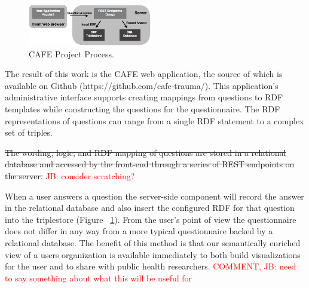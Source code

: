 \documentclass{amia}
\begin{document}
\begin{figure}
  \begin{center}
    \includegraphics[width=0.48\textwidth]{pics/cafe_process2.png}
  \end{center}
  \caption{CAFE Project Process.}
  \label{cafe_process}
\end{figure}

The result of this work is the CAFE web application, the source of which is available on Github (https://github.com/cafe-trauma/). 
This application's administrative interface supports creating mappings from questions to RDF templates while constructing the questions for the questionnaire. The RDF representations of questions can range from a single RDF statement to a complex set of triples.

\sout {The wording, logic, and RDF mapping of questions are stored in a relational database and accessed by the front-end through a series of REST endpoints on the server.}
\textcolor{red}{JB: consider scratching?}

When a user answers a question the server-side component will record the answer in the relational database and also insert the configured RDF for that question into the triplestore (Figure ~\ref{cafe_process}).
From the user's point of view the questionnaire does not differ in any way from a more typical questionnaire backed by a relational database.
The benefit of this method is that our semantically enriched view of a users organization is available immediately to both build visualizations for the user and to share with public health researchers.
\textcolor{red}{COMMENT, JB: need to say something about what this will be useful for}


\makeatletter
\renewcommand{\@biblabel}[1]{\hfill #1.}
\makeatother


\end{document}
